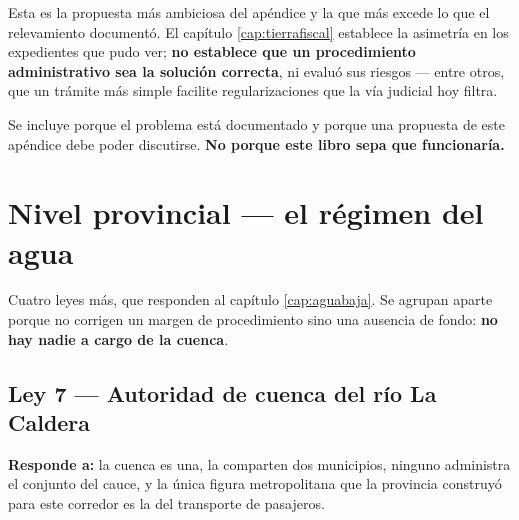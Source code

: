 \begin{cautela}
Esta es la propuesta más ambiciosa del apéndice y la que más excede lo que el relevamiento
documentó. El capítulo \ref{cap:tierrafiscal} establece la asimetría en los expedientes que
pudo ver; \textbf{no establece que un procedimiento administrativo sea la solución correcta},
ni evaluó sus riesgos --- entre otros, que un trámite más simple facilite regularizaciones que
la vía judicial hoy filtra.

Se incluye porque el problema está documentado y porque una propuesta de este apéndice debe
poder discutirse. \textbf{No porque este libro sepa que funcionaría.}
\end{cautela}

\section{Nivel provincial --- el régimen del agua}

Cuatro leyes más, que responden al capítulo \ref{cap:aguabaja}. Se agrupan aparte porque no
corrigen un margen de procedimiento sino una ausencia de fondo: \textbf{no hay nadie a cargo
de la cuenca}.

\subsection{Ley 7 --- Autoridad de cuenca del río La Caldera}

\textbf{Responde a:} la cuenca es una, la comparten dos municipios, ninguno administra el
conjunto del cauce, y la única figura metropolitana que la provincia construyó para este
corredor es la del transporte de pasajeros.

